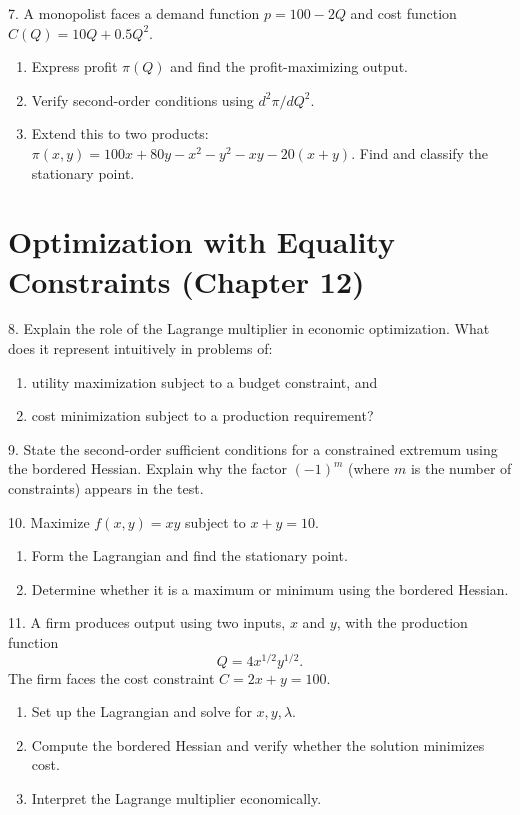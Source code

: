 \documentclass[12pt]{article}
\begin{document}
7. A monopolist faces a demand function \(p = 100 - 2Q\) and cost function \(C(Q) = 10Q + 0.5Q^2.\)
   \begin{enumerate}
     \item Express profit \(\pi(Q)\) and find the profit-maximizing output.
     \item Verify second-order conditions using \(d^2\pi/dQ^2\).
     \item Extend this to two products: \(\pi(x, y) = 100x + 80y - x^2 - y^2 - xy - 20(x + y)\). 
     Find and classify the stationary point.
   \end{enumerate}

\hrulefill

\section*{Optimization with Equality Constraints (Chapter 12)}



8. Explain the role of the Lagrange multiplier in economic optimization.  
   What does it represent intuitively in problems of:
   \begin{enumerate}
     \item utility maximization subject to a budget constraint, and
     \item cost minimization subject to a production requirement?
   \end{enumerate}

9. State the second-order sufficient conditions for a constrained extremum using the bordered Hessian.  
   Explain why the factor \((-1)^m\) (where \(m\) is the number of constraints) appears in the test.

\newpage

10. Maximize \(f(x, y) = xy\) subject to \(x + y = 10\).
    \begin{enumerate}
      \item Form the Lagrangian and find the stationary point.
      \item Determine whether it is a maximum or minimum using the bordered Hessian.
    \end{enumerate}

11. A firm produces output using two inputs, \(x\) and \(y\), with the production function
    \[
    Q = 4x^{1/2}y^{1/2}.
    \]
    The firm faces the cost constraint \(C = 2x + y = 100.\)
    \begin{enumerate}
      \item Set up the Lagrangian and solve for \(x, y, \lambda.\)
      \item Compute the bordered Hessian and verify whether the solution minimizes cost.
      \item Interpret the Lagrange multiplier economically.
    \end{enumerate}
\end{document}
